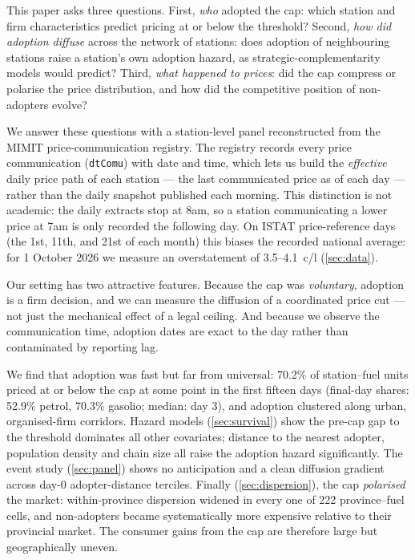 \documentclass[11pt]{article}
\begin{document}
This paper asks three questions. First, \emph{who} adopted the cap: which
station and firm characteristics predict pricing at or below the
threshold? Second, \emph{how did adoption diffuse} across the network of
stations: does adoption of neighbouring stations raise a station's own
adoption hazard, as strategic-complementarity models would predict?
Third, \emph{what happened to prices}: did the cap compress or polarise
the price distribution, and how did the competitive position of
non-adopters evolve?

We answer these questions with a station-level panel reconstructed from
the MIMIT price-communication registry. The registry records every price
communication (\texttt{dtComu}) with date and time, which lets us build
the \emph{effective} daily price path of each station --- the last
communicated price as of each day --- rather than the daily snapshot
published each morning. This distinction is not academic: the daily
extracts stop at 8am, so a station communicating a lower price at 7am is
only recorded the following day. On ISTAT price-reference days (the 1st,
11th, and 21st of each month) this biases the recorded national average:
for 1 October 2026 we measure an overstatement of 3.5--4.1~c/l
(\cref{sec:data}).

Our setting has two attractive features. Because the cap was
\emph{voluntary}, adoption is a firm decision, and we can measure the
diffusion of a coordinated price cut --- not just the mechanical effect of
a legal ceiling. And because we observe the communication time, adoption
dates are exact to the day rather than contaminated by reporting lag.

We find that adoption was fast but far from universal: 70.2\% of
station--fuel units priced at or below the cap at some point in the
first fifteen days (final-day shares: 52.9\% petrol, 70.3\% gasolio;
median: day 3), and adoption clustered along urban, organised-firm
corridors. Hazard models (\cref{sec:survival}) show the pre-cap gap to
the threshold dominates all other covariates; distance to the nearest
adopter, population density and chain size all raise the adoption hazard
significantly. The event study (\cref{sec:panel}) shows no anticipation
and a clean diffusion gradient across day-0 adopter-distance terciles.
Finally (\cref{sec:dispersion}), the cap \emph{polarised} the market:
within-province dispersion widened in every one of 222 province--fuel
cells, and non-adopters became systematically more expensive relative to
their provincial market. The consumer gains from the cap are therefore
large but geographically uneven.
\end{document}
